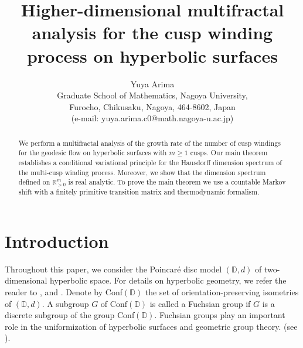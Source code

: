 \documentclass{article}
\title{Higher-dimensional multifractal analysis for the cusp winding process  on hyperbolic surfaces}
\author{Yuya Arima\\
 Graduate School of Mathematics, Nagoya University,\\
Furocho, Chikusaku, Nagoya, 464-8602, Japan\\
(e-mail: yuya.arima.c0@math.nagoya-u.ac.jp)}
\theoremstyle{definition}
\begin{document}
\maketitle




\begin{abstract}
    We perform a multifractal analysis of the growth rate of the number of cusp windings for the geodesic flow on hyperbolic surfaces with $m \geq 1$ cusps. Our main theorem establishes a conditional variational principle for the Hausdorff dimension spectrum of the multi-cusp winding process. Moreover, we show that  the dimension spectrum defined on $\mathbb{R}_{>0}^m$ is real analytic. To prove the main theorem we use a countable Markov shift with a finitely primitive transition matrix and thermodynamic formalism.   
\end{abstract}
\section{Introduction}
Throughout this paper, we consider the Poincar\'e disc model $(\mathbb{D}, d)$ of two-dimensional hyperbolic space. For details on hyperbolic geometry, we refer the reader to \cite{Dal}, \cite{katok1992fuchsian} and \cite{beardon2012geometry}.
Denote by Conf$(\mathbb{D})$ the set of orientation-preserving isometries of $(\mathbb{D},d)$. A subgroup $G$ of $\text{Conf}(\mathbb{D})$ is called a Fuchsian group if $G$ is a discrete subgroup of the group Conf$(\mathbb{D})$. Fuchsian groups play an important role in the uniformization of hyperbolic surfaces and geometric group
theory. (see \cite[Section 6]{beardon2012geometry}).
\end{document}
